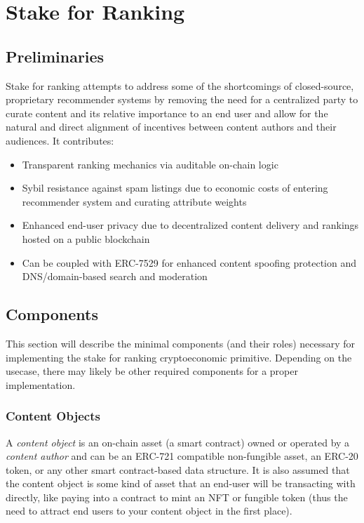 \section{Stake for Ranking} 
\label{section:ProtocolDescription}

\subsection{Preliminaries}
Stake for ranking attempts to address some of the shortcomings of closed-source, proprietary recommender systems by removing the need for a centralized party to curate content and its relative importance to an end user and allow for the natural and direct alignment of incentives between content authors and their audiences. It contributes:
\begin{itemize}
    \item Transparent ranking mechanics via auditable on-chain logic
    \item Sybil resistance against spam listings due to economic costs of entering recommender system and curating attribute weights
    \item Enhanced end-user privacy due to decentralized content delivery and rankings hosted on a public blockchain
    \item Can be coupled with ERC-7529 \cite{chapman2023erc7529} for enhanced content spoofing protection and DNS/domain-based search and moderation
\end{itemize}

\subsection{Components}
\label{Components}

This section will describe the minimal components (and their roles) necessary for implementing the stake for ranking cryptoeconomic primitive. Depending on the usecase, there may likely be other required components for a proper implementation. 

\subsubsection{Content Objects}
\label{ContentObjectDefinition}

A \textit{content object} is an on-chain asset (a smart contract) owned or operated by a \textit{content author} and can be an ERC-721 compatible non-fungible asset, an ERC-20 token, or any other smart contract-based data structure. It is also assumed that the content object is some kind of asset that an end-user will be transacting with directly, like paying into a contract to mint an NFT or fungible token (thus the need to attract end users to your content object in the first place). 

